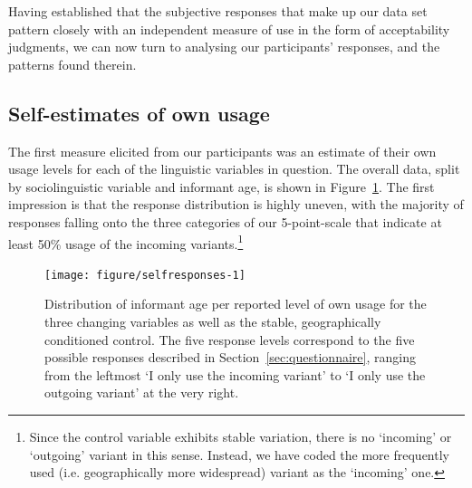 


Having established that the subjective responses that make up our data set pattern closely with an independent measure of use in the form of acceptability judgments,
we can now turn to analysing our participants' responses, and the patterns found therein.

\subsection{Self-estimates of own usage}
\label{sec:selfresponses}

The first measure elicited from our participants was an estimate of their own usage levels for each of the linguistic variables in question.
The overall data, split by sociolinguistic variable and informant age, is shown in Figure~\ref{fig:selfresponses}. The first impression is that the response distribution is highly uneven, with the majority of responses falling onto the three categories of our 5-point-scale that indicate at least 50\% usage of the incoming variants.\footnote{Since the control variable exhibits stable variation, there is no `incoming' or `outgoing' variant in this sense. Instead, we have coded the more frequently used (i.e. geographically more widespread) variant as the `incoming' one.}

\begin{figure}[htbp]

{\centering \texttt{[image: figure/selfresponses-1]} 

}

\caption[Distribution of informant age per reported level of own usage for the three changing variables as well as the stable, geographically conditioned control]{Distribution of informant age per reported level of own usage for the three changing variables as well as the stable, geographically conditioned control. The five response levels correspond to the five possible responses described in Section~\ref{sec:questionnaire}, ranging from the leftmost `I only use the incoming variant' to `I only use the outgoing variant' at the very right.}\label{fig:selfresponses}
\end{figure}






